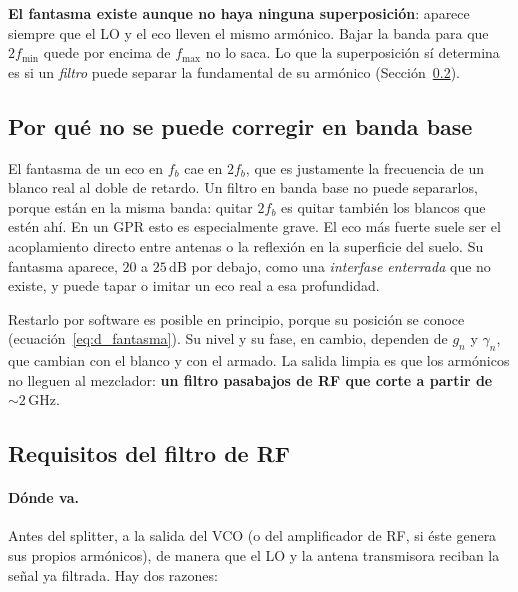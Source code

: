 \documentclass[12pt, a4paper, twoside]{report}
\begin{document}
\textbf{El fantasma existe aunque no haya ninguna superposición}: aparece
siempre que el LO y el eco lleven el mismo armónico. Bajar la banda para que
$2f_\text{min}$ quede por encima de $f_\text{max}$ no lo saca. Lo que la
superposición sí determina es si un \emph{filtro} puede separar la
fundamental de su armónico (Sección~\ref{sub:armonicos_requisitos}).

\subsection{Por qué no se puede corregir en banda base}
\label{sub:armonicos_banda_base}

El fantasma de un eco en $f_b$ cae en $2f_b$, que es justamente la
frecuencia de un blanco real al doble de retardo. Un filtro en banda base no
puede separarlos, porque están en la misma banda: quitar $2f_b$ es quitar
también los blancos que estén ahí. En un GPR esto es especialmente grave. El
eco más fuerte suele ser el acoplamiento directo entre antenas o la
reflexión en la superficie del suelo. Su fantasma aparece, $20$ a
$25\,\text{dB}$ por debajo, como una \emph{interfase enterrada} que no
existe, y puede tapar o imitar un eco real a esa profundidad.

Restarlo por software es posible en principio, porque su posición se conoce
(ecuación~\eqref{eq:d_fantasma}). Su nivel y su fase, en cambio, dependen de
$g_n$ y $\gamma_n$, que cambian con el blanco y con el armado. La salida
limpia es que los armónicos no lleguen al mezclador: \textbf{un filtro
pasabajos de RF que corte a partir de $\sim\!2\,\text{GHz}$}.

\subsection{Requisitos del filtro de RF}
\label{sub:armonicos_requisitos}

\paragraph{Dónde va.} Antes del splitter, a la salida del VCO (o del
amplificador de RF, si éste genera sus propios armónicos), de manera que el
LO y la antena transmisora reciban la señal ya filtrada. Hay dos razones:
\end{document}
